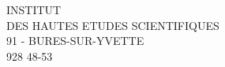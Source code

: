 \begin{center}
INSTITUT\\
DES HAUTES ETUDES SCIENTIFIQUES\\
91 - BURES-SUR-YVETTE\\
928 48-53
\end{center}
